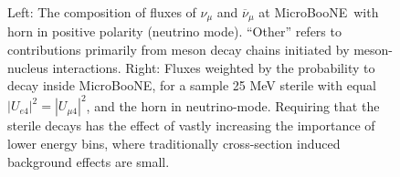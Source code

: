 \documentclass[11pt, a4paper]{article}
\def\muboone{MicroBooNE}
\begin{document}
\begin{figure}[t]
\caption{\label{fig:flux_plots} Left: The composition of fluxes of $\nu_\mu$
and $\overline{\nu}_\mu$ at \muboone\ with horn in positive polarity (neutrino
mode). ``Other'' refers to contributions primarily from meson decay chains
initiated by meson-nucleus interactions. Right: Fluxes weighted by the
probability to decay inside \muboone, for a sample 25 MeV sterile with equal
$|U_{e4}|^2 = |U_{\mu 4}|^2$, and the horn in neutrino-mode. Requiring that the
sterile decays has the effect of vastly increasing the importance of lower
energy bins, where traditionally cross-section induced background effects are
small.}

\end{figure}

\begin{figure}[t]
\center

\end{figure}
\end{document}
